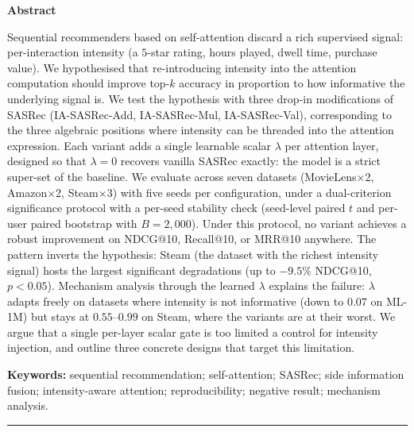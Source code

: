 \bigskip

\noindent\textbf{Abstract}

\noindent Sequential recommenders based on self-attention discard a
rich supervised signal: per-interaction intensity (a $5$-star
rating, hours played, dwell time, purchase value). We hypothesised
that re-introducing intensity into the attention computation should
improve top-$k$ accuracy in proportion to how informative the
underlying signal is. We test the hypothesis with three drop-in
modifications of SASRec (IA-SASRec-Add, IA-SASRec-Mul, IA-SASRec-Val),
corresponding to the three algebraic positions where intensity
can be threaded into the attention expression. Each variant adds a
single learnable scalar $\lambda$ per attention layer, designed so
that $\lambda{=}0$ recovers vanilla SASRec exactly: the model is a
strict super-set of the baseline. We evaluate across seven datasets
(MovieLens$\times$2, Amazon$\times$2, Steam$\times$3) with five seeds
per configuration, under a dual-criterion significance protocol with a
per-seed stability check (seed-level paired $t$ and per-user paired
bootstrap with $B{=}2{,}000$). Under this protocol, no variant achieves
a robust improvement on NDCG@10, Recall@10, or MRR@10 anywhere. The
pattern inverts the hypothesis: Steam (the dataset with the richest
intensity signal) hosts the largest significant degradations (up to
$-9.5\%$ NDCG@10, $p<0.05$). Mechanism analysis through the learned
$\lambda$ explains the failure: $\lambda$ adapts freely on datasets
where intensity is not informative (down to $0.07$ on ML-1M) but stays
at $0.55$--$0.99$ on Steam, where the variants are at their worst.
We argue that a single per-layer scalar gate is too limited a control
for intensity injection, and outline three concrete designs that target
this limitation.

\noindent\textbf{Keywords:} sequential recommendation; self-attention;
SASRec; side information fusion; intensity-aware attention;
reproducibility; negative result; mechanism analysis.

\bigskip\hrule\bigskip
